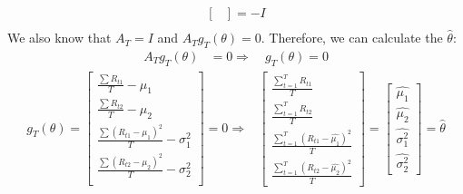 \begin{enumerate}[(a)]
\begin{equation*}
\begin{aligned}
\begin{bmatrix}
    \end{bmatrix} = -I\\
  \end{aligned}
\end{equation*}
We also know that $A_T = I$ and $A_T g_T(\theta) = 0$. Therefore, we can calculate the $\hat{\theta}$:
\begin{equation*}
  \begin{aligned}
    A_T g_T(\theta) & = 0 \Rightarrow \quad g_T(\theta) =  0 
  \end{aligned}
\end{equation*}
\begin{equation*}
  \begin{aligned}
    g_T(\theta) = \begin{bmatrix}
      \frac{\sum R_{t1}}{T} - \mu_1 \\
      \frac{\sum R_{t2}}{T} - \mu_2\\
       \frac{\sum (R_{t1} - \mu_1)^2 }{T}- \sigma_1^2 \\
      \frac{\sum (R_{t2}- \mu_2)^2}{T}  - \sigma_2^2\\
  \end{bmatrix} = 0 \Rightarrow &  \begin{bmatrix}
      \frac{\sum_{t=1}^T R_{t1}}{T} \\
      \frac{\sum_{t=1}^T R_{t2}}{T} \\
      \frac{\sum_{t=1}^T (R_{t1} - \hat{\mu_1})^2}{T} \\
      \frac{\sum_{t=1}^T (R_{t2} - \hat{\mu_2})^2}{T}
    \end{bmatrix} = \begin{bmatrix}
      \hat{\mu_1} \\
      \hat{\mu_2} \\
      \hat{\sigma_1^2} \\
      \hat{\sigma_2^2}
    \end{bmatrix} = \hat{\theta} \\
  \end{aligned}
\end{equation*}


\end{enumerate}
